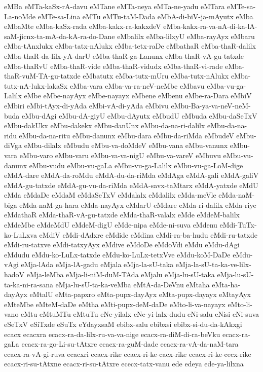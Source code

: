 {eMBa
eMTa-kaSx-rA-davu
eMTane
eMTa-neya
eMTa-ne-yadu
eMTara
eMTe-sa-La-noMde
eMTe-sa-Lina
eMTu
eMTu-taM-Dada
eMbA-di-biV-ja-mAyutx
eMba
eMbaMte
eMba-kaSx-rada
eMba-kakx-ra-kakxdeV
eMba-kakx-ra-va-nA-di-ka-lA-saM-jicnx-ta-mA-da-kA-ra-do-Dane
eMbalilx
eMba-lilxyU
eMba-rayAyx
eMbaru
eMba-tAnxlukx
eMba-tatx-nAlukx
eMba-tetx-raDe
eMbathaR
eMba-thaR-dalilx
eMba-thaR-da-lilx-yA-darU
eMba-thaR-ga-Lanunx
eMba-thaR-vA-gu-tatxde
eMba-thaRvU
eMba-thaR-vide
eMba-thaR-vidudx
eMba-thaR-vi-rade
eMba-thaR-vuM-TA-gu-tatxde
eMbatutx
eMba-tutx-mUru
eMba-tutx-nAlukx
eMba-tutx-nA-lukx-lakaSx
eMba-vara
eMba-va-ra-neV-neMbe
eMbavu
eMba-vu-ga-Lalilx
eMbe
eMbe-nayAyx
eMbe-nayayx
eMbene
eMbenu
eMbe-ra-Dara
eMbiV
eMbiri
eMbi-tAyx-di-yAda
eMbi-vA-di-yAda
eMbivu
eMbu-Ba-ya-va-neV-neM-buda
eMbu-dAgi
eMbu-dA-giyU
eMbu-dAyutx
eMbudU
eMbuda
eMbu-daSeTxV
eMbu-dakUkx
eMbu-dakekx
eMbu-danUnx
eMbu-da-na-ri-dalilx
eMbu-da-na-ridu
eMbu-da-na-ritu
eMbu-danunx
eMbu-dara
eMbu-da-riMda
eMbudeV
eMbu-diVga
eMbu-dilalx
eMbudu
eMbu-va-doMdeV
eMbu-vana
eMbu-vanunx
eMbu-vara
eMbu-varo
eMbu-varu
eMbu-va-va-nigU
eMbu-va-vareV
eMbuvu
eMbu-vu-danunx
eMbu-vudu
eMbu-vu-gaLa
eMbu-vu-ga-Lalilx
eMbu-vu-ga-LoM-dige
eMdA-dare
eMdA-da-roMdu
eMdA-du-da-riMda
eMdAga
eMdA-gali
eMdA-galiV
eMdA-gu-tatxde
eMdA-gu-vu-da-riMda
eMdA-savx-taMtarx
eMdA-yatxde
eMdU
eMda
eMdaDe
eMdaM
eMdaSeTxV
eMdalalx
eMdalilx
eMda-meVle
eMda-naM-biga
eMda-naM-ga-hara
eMda-nayAyx
eMdarU
eMdare
eMda-ri-dalilx
eMda-riye
eMdathaR
eMda-thaR-vA-gu-tatxde
eMda-thaR-valalx
eMde
eMdeM-balilx
eMdeMbe
eMdeMdU
eMdeM-digU
eMde-nipa
eMde-ni-suva
eMdenu
eMdi-TuTx-ko-LuLxva
eMdiV
eMdi-dAdxre
eMdide
eMdina
eMdi-ra-ba-hudu
eMdi-ru-tatxde
eMdi-ru-tatxve
eMdi-tatxyAyx
eMdive
eMdoDe
eMdoVdi
eMdu
eMdu-dAgi
eMdudu
eMdu-ko-LuLx-tatxde
eMdu-ko-LuLx-tetxVve
eMdu-koM-DaDe
eMdu-vAgi
eMja-lAda
eMja-lA-gadu
eMjala
eMja-la-sU-taka
eMja-la-sU-ta-ka-ve-lilx-hadoV
eMja-leMba
eMja-li-niM-duM-TAda
eMjalu
eMja-lu-sU-taka
eMja-lu-sU-ta-ka-ni-ra-sana
eMja-lu-sU-ta-ka-veMba
eMtA-da-DeVnu
eMtaha
eMta-ha-dayAyx
eMtalU
eMta-papxro
eMta-pupx-dayAyx
eMta-pupx-dayayx
eMtayAyx
eMteMbe
eMteM-daDe
eMtha
eMti-pupx-deM-daDe
eMto-li-va-nayayx
eMto-li-vano
eMtu
eMtuMTu
eMtuTu
eNe-yilalx
eNe-yi-lalx-dudu
eNi-salu
eNisi
eNi-suva
eSeTxV
eSiTxde
eSuTx
eYdayxsaM
ebibx-salu
ebibxsi
ebibx-si-du-da-kAkxgi
ecacx
ecacxra
ecacx-ra-da-lilx-ru-va-va-nige
ecacx-ra-diM-di-ra-beVku
ecacx-ra-gaLa
ecacx-ra-go-Li-su-tAtxre
ecacx-ra-guM-dade
ecacx-ra-vA-da-naM-tara
ecacx-ra-vA-gi-ruva
ecacxri
ecacx-rike
ecacx-ri-ke-cacx-rike
ecacx-ri-ke-cecx-rike
ecacx-ri-su-tAtxne
ecacx-ri-su-tAtxre
ececx-tatx-vanu
ede
edeya
ede-ya-lilxna
}

